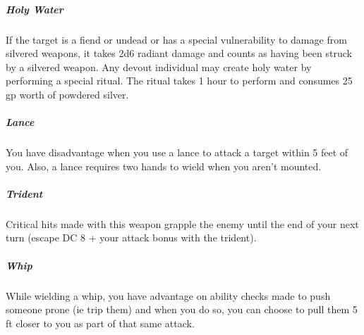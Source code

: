 \subparagraph*{Holy Water} If the target is a fiend or undead or has a special vulnerability to damage from silvered weapons, it takes 2d6 radiant damage and counts as having been struck by a silvered weapon. Any devout individual may create holy water by performing a special ritual. The ritual takes 1 hour to perform and consumes 25 gp worth of powdered silver.

\subparagraph*{Lance} You have disadvantage when you use a lance to attack a target within 5 feet of you. Also, a lance requires two hands to wield when you aren't mounted.

\subparagraph*{Trident} Critical hits made with this weapon grapple the enemy until the end of your next turn (escape DC 8 + your attack bonus with the trident).

\subparagraph*{Whip} While wielding a whip, you have advantage on ability checks made to push someone prone (ie trip them) and when you do so, you can choose to pull them 5 ft closer to you as part of that same attack.

